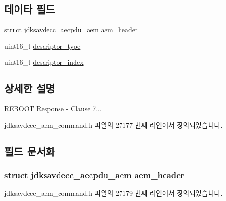 \subsection*{데이타 필드}
\begin{DoxyCompactItemize}
\item 
struct \hyperlink{structjdksavdecc__aecpdu__aem}{jdksavdecc\+\_\+aecpdu\+\_\+aem} \hyperlink{structjdksavdecc__aem__command__reboot__response_ae1e77ccb75ff5021ad923221eab38294}{aem\+\_\+header}
\item 
uint16\+\_\+t \hyperlink{structjdksavdecc__aem__command__reboot__response_ab7c32b6c7131c13d4ea3b7ee2f09b78d}{descriptor\+\_\+type}
\item 
uint16\+\_\+t \hyperlink{structjdksavdecc__aem__command__reboot__response_a042bbc76d835b82d27c1932431ee38d4}{descriptor\+\_\+index}
\end{DoxyCompactItemize}


\subsection{상세한 설명}
R\+E\+B\+O\+OT Response -\/ Clause 7... 

jdksavdecc\+\_\+aem\+\_\+command.\+h 파일의 27177 번째 라인에서 정의되었습니다.



\subsection{필드 문서화}
\subsubsection[{\texorpdfstring{aem\+\_\+header}{aem_header}}]{\setlength{\rightskip}{0pt plus 5cm}struct {\bf jdksavdecc\+\_\+aecpdu\+\_\+aem} aem\+\_\+header}\hypertarget{structjdksavdecc__aem__command__reboot__response_ae1e77ccb75ff5021ad923221eab38294}{}\label{structjdksavdecc__aem__command__reboot__response_ae1e77ccb75ff5021ad923221eab38294}


jdksavdecc\+\_\+aem\+\_\+command.\+h 파일의 27179 번째 라인에서 정의되었습니다.

